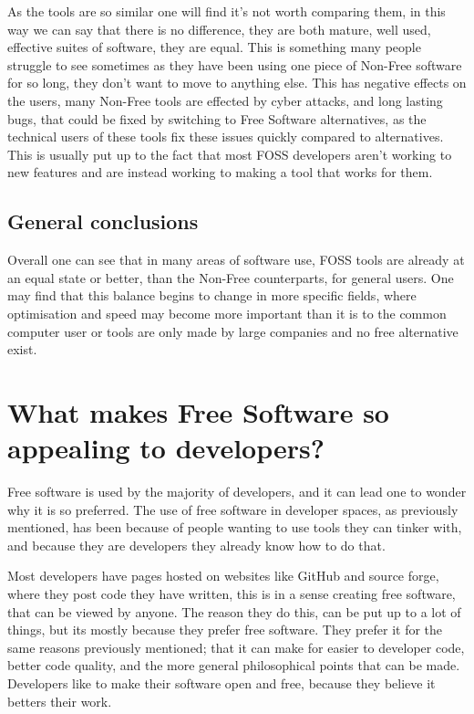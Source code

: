 \documentclass[a4paper,12pt]{article}
\begin{document}
{As the tools are so similar one will find it's not worth comparing them, in this way we can say that there is no
difference, they are both mature, well used, effective suites of software, they are equal. This is something many
people struggle to see sometimes as they have been using one piece of Non-Free software for so long, they don't
want to move to anything else.	This has negative effects on the users, many Non-Free tools are effected by cyber
attacks, and long lasting bugs, that could be fixed by switching to Free Software alternatives, as the technical
users of these tools fix these issues quickly compared to alternatives. This is usually put up to the fact that
most FOSS developers aren't working to new features and are instead working to making a tool that works for them.

\subsection{General conclusions} 
Overall one can see that in many areas of software use, FOSS tools are already
at an equal state or better, than the Non-Free counterparts, for general users. One may find that this balance
begins to change in more specific fields, where optimisation and speed may become more important than it is to
the common computer user or tools are only made by large companies and no free alternative exist.

\section{What makes Free Software so appealing to developers?} 
Free software is used by the majority of developers, and it can lead one to wonder why it is so preferred. The
use of free software in developer spaces, as previously mentioned, has been because of people wanting to use
tools they can tinker with, and because they are developers they already know how to do that.

Most developers have pages hosted on websites like GitHub and source forge, where they post code they have written,
this is in a sense creating free software, that can be viewed by anyone. The reason they do this, can be
put up to a lot of things, but its mostly because they prefer free software. They prefer it for the same reasons 
previously mentioned; that it can make for easier to developer code, better code quality, and the more general
philosophical points that can be made. Developers like to make their software open and free, because they believe 
it betters their work.

}
\end{document}
